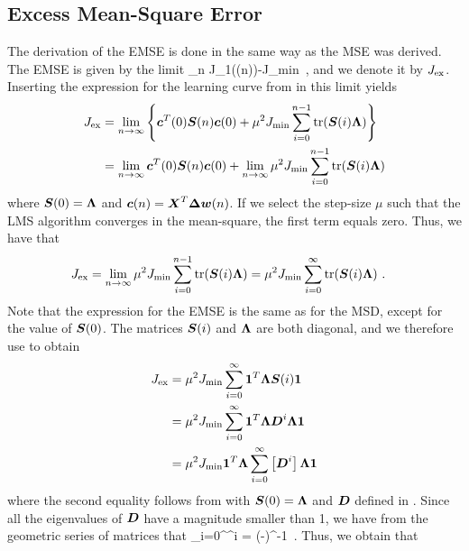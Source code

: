 \subsection{Excess Mean-Square Error}
The derivation of the EMSE is done in the same way as the MSE was derived. The EMSE is given by the limit
\bmath
  \qquad  \lim_{n\to\infty} J_1((n))-J_\textup{min}\ ,
\emath
and we denote it by $J_\textup{ex}$. Inserting the expression for the learning curve from  in this limit yields
\begin{align}
  J_\textup{ex} &= \lim_{n\to\infty} \left\{\boldsymbol{c}^T(0)\boldsymbol{S}(n)\boldsymbol{c}(0)+\mu^2J_\textup{min}\sum_{i=0}^{n-1}\textup{tr}(\boldsymbol{S}(i)\boldsymbol{\Lambda})\right\}\\
  &= \lim_{n\to\infty} \boldsymbol{c}^T(0)\boldsymbol{S}(n)\boldsymbol{c}(0)+\lim_{n\to\infty}\mu^2J_\textup{min}\sum_{i=0}^{n-1}\textup{tr}(\boldsymbol{S}(i)\boldsymbol{\Lambda})
\end{align}
where $\boldsymbol{S}(0)=\boldsymbol{\Lambda}$ and $\boldsymbol{c}(n)= \boldsymbol{X}^T\boldsymbol{\Delta}\boldsymbol{w}(n)$. If we select the step-size $\mu$ such that the LMS algorithm converges in the mean-square, the first term equals zero. Thus, we have that
\begin{align}
  J_\textup{ex} &= \lim_{n\to\infty} \mu^2J_\textup{min}\sum_{i=0}^{n-1}\textup{tr}(\boldsymbol{S}(i)\boldsymbol{\Lambda}) = \mu^2J_\textup{min}\sum_{i=0}^{\infty}\textup{tr}(\boldsymbol{S}(i)\boldsymbol{\Lambda})\ .
\end{align}
Note that the expression for the EMSE is the same as for the MSD, except for the value of $\boldsymbol{S}(0)$. The matrices $\boldsymbol{S}(i)$ and $\boldsymbol{\Lambda}$ are both diagonal, and we therefore use  to obtain
\begin{align}
  J_\textup{ex} &= \mu^2J_\textup{min}\sum_{i=0}^{\infty}\boldsymbol{1}^T\boldsymbol{\Lambda}\boldsymbol{S}(i)\boldsymbol{1}\\
  &= \mu^2J_\textup{min}\sum_{i=0}^{\infty}\boldsymbol{1}^T\boldsymbol{\Lambda}\boldsymbol{D}^i\boldsymbol{\Lambda}\boldsymbol{1}\\
  &= \mu^2J_\textup{min}\boldsymbol{1}^T\boldsymbol{\Lambda}\sum_{i=0}^{\infty}\left[\boldsymbol{D}^i\right]\boldsymbol{\Lambda}\boldsymbol{1}
\end{align}
where the second equality follows from  with $\boldsymbol{S}(0)=\boldsymbol{\Lambda}$ and $\boldsymbol{D}$ defined in . Since all the eigenvalues of $\boldsymbol{D}$ have a magnitude smaller than 1, we have from the geometric series of matrices that \cite[p.~58]{Petersen2008}
\bmath
  \sum_{i=0}^{\infty}^i = (-)^{-1}\ .
\emath
Thus, we obtain that

